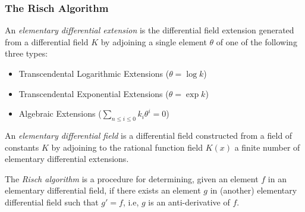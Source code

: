 \documentclass[aspectratio=169,dvipsnames]{beamer}
\begin{document}
\begin{frame}
\frametitle{The Risch Algorithm}
\begin{definition}
An {\it elementary differential extension} is the differential field
extension generated from a differential field $K$ by adjoining
a single element $\theta$ of one of the following three types:
\begin{itemize}
\item Transcendental Logarithmic Extensions ($\theta = \log k$)
\item Transcendental Exponential Extensions ($\theta = \exp k$)
\item Algebraic Extensions ($\sum_{n\le i\le 0} k_i \theta^i = 0$)
\end{itemize}
\end{definition}

\begin{definition}
An {\it elementary differential field} is a differential field
constructed from a field of constants $K$ by adjoining to the
rational function field $K(x)$ a finite number of elementary differential extensions.
\end{definition}

\begin{block}{}
The {\it Risch algorithm} is a procedure for determining,
given an element $f$ in an elementary differential field,
if there exists an element $g$ in (another) elementary differential
field such that $g' = f$, i.e, $g$ is an anti-derivative of $f$.
\end{block}
\end{frame}
\end{document}

